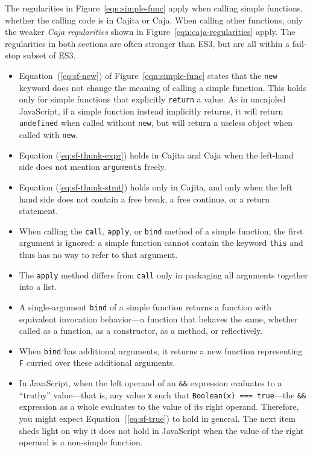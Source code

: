 \documentclass[letterpaper,twocolumn,10pt]{article}
\newcommand{\code}[1]{{\tt {#1}}}              %
\begin{document}
The regularities in Figure~\ref{eqn:simple-func} apply when calling simple functions, whether the 
calling code is in Cajita or Caja. When calling other functions, only the 
weaker \emph{Caja regularities} shown in Figure~\ref{eqn:caja-regularities} apply. The 
regularities in both sections are often stronger than ES3, but are all within 
a fail-stop subset of ES3.

\begin{itemize}
  \item Equation~(\ref{eq:sf-new}) of Figure~\ref{eqn:simple-func} states that the \code{new} keyword does not change 
  the meaning of calling a simple function. This holds only for simple functions that explicitly \code{return} a 
  value. As in uncajoled JavaScript, if a simple function instead implicitly returns, it will return \code{undefined}
  when called without \code{new}, but will return a useless object when called with \code{new}.
  
  \item Equation (\ref{eq:sf-thunk-expr}) holds in Cajita and Caja when the left-hand side does not mention \code{arguments} freely.
  
  \item Equation (\ref{eq:sf-thunk-stmt}) holds only in Cajita, and only when the left hand side does not contain 
  a free break, a free continue, or a return statement.
    
  \item When calling the \code{call}, \code{apply}, or \code{bind} method of a simple function, the first argument is 
  ignored: a simple function cannot contain the keyword \code{this} and thus has no way to refer to that argument.
  
  \item The \code{apply} method differs from \code{call} only in packaging all arguments together into a list.
  
  \item A single-argument \code{bind} of a simple function returns a function with equivalent invocation behavior---a 
  function that behaves the same, whether called as a function, as a constructor, as a method, or reflectively.
  
  \item When \code{bind} has additional arguments, it returns a new function representing \code{F} curried over these 
  additional arguments.
  
  \item In JavaScript, when the left operand of an \code{\&\&} expression evaluates to a ``truthy'' value---that is,
  any value \code{x} such that \code{Boolean(x) === true}---the \code{\&\&} 
  expression as a whole evaluates to the value of its right operand. Therefore, you might expect 
  Equation~(\ref{eq:sf-true}) to hold in general. The next item sheds light on why it does not hold in JavaScript 
  when the value of the right operand is a non-simple function.


\end{itemize}
\end{document}
